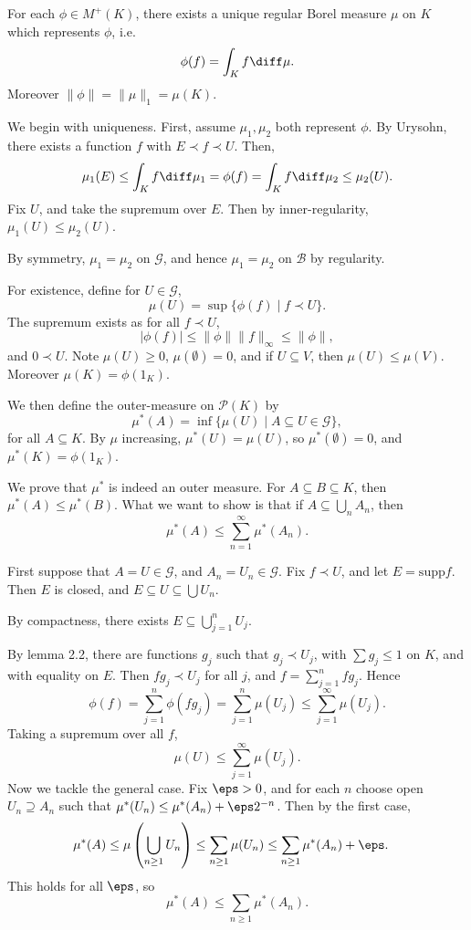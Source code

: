 \documentclass[12pt]{article}
\begin{document}
\begin{theorem}
	For each $\phi \in M^{+}(K)$, there exists a unique regular Borel measure $\mu$ on $K$ which represents $\phi$, i.e.
	\[
	\phi(f) = \int_K f \diff \mu.
	\]
	Moreover $\|\phi\| = \|\mu\|_1 = \mu(K)$.
\end{theorem}

\begin{proofbox}
	We begin with uniqueness. First, assume $\mu_1, \mu_2$ both represent $\phi$. By Urysohn, there exists a function $f$ with $E \prec f \prec U$. Then,
	\[
	\mu_1(E) \leq \int_K f \diff \mu_1 = \phi(f) = \int_K f \diff \mu_2 \leq \mu_2(U).
	\]
	Fix $U$, and take the supremum over $E$. Then by inner-regularity, $\mu_1(U) \leq \mu_2(U)$.

	By symmetry,  $\mu_1 = \mu_2$ on $\mathcal{G}$, and hence $\mu_1 = \mu_2$ on $\mathcal{B}$ by regularity.

	For existence, define for $U \in \mathcal{G}$,
	\[
		\mu(U) = \sup \{ \phi(f) \mid f \prec U\}.
	\]
	The supremum exists as for all $f \prec U$,
	\[
	|\phi(f)| \leq \|\phi\| \|f\|_\infty \leq \|\phi\|,
	\]
	and $0 \prec U$. Note $\mu(U) \geq 0$, $\mu(\emptyset) = 0$, and if $U \subseteq V$, then $\mu(U) \leq \mu(V)$. Moreover $\mu(K) = \phi(1_{K})$.

	We then define the outer-measure on $\mathcal{P}(K)$ by
	\[
		\mu^{\ast}(A) = \inf \{ \mu(U) \mid A \subseteq U \in \mathcal{G}\},
	\]
	for all $A \subseteq K$. By $\mu$ increasing, $\mu^{\ast}(U) = \mu(U)$, so $\mu^{\ast}(\emptyset) = 0$, and $\mu^{\ast}(K) = \phi(1_{K})$.

	We prove that $\mu^{\ast}$ is indeed an outer measure. For $A \subseteq B \subseteq K$, then $\mu^{\ast}(A) \leq \mu^{\ast}(B)$. What we want to show is that if $A \subseteq \bigcup_{n} A_n$, then
	\[
	\mu^{\ast} (A) \leq \sum_{n = 1}^\infty \mu^{\ast}(A_n).
	\]

	First suppose that $A = U \in \mathcal{G}$, and $A_n = U_n \in \mathcal{G}$. Fix $f \prec U$, and let $E = \mathrm{supp} f$. Then $E$ is closed, and $E \subseteq U \subseteq \bigcup U_n$.

	By compactness, there exists $E \subseteq \bigcup_{j=1}^n U_j$.

	By lemma 2.2, there are functions $g_j$ such that $g_j \prec U_j$, with $\sum g_j \leq 1$ on $K$, and with equality on $E$. Then $fg_j \prec U_j$ for all $j$, and $f = \sum_{j = 1}^n f g_j$. Hence
	\[
	\phi(f) = \sum_{j = 1}^n \phi(f g_j) = \sum_{j = 1}^n \mu(U_j) \leq \sum_{j = 1}^\infty \mu(U_j).
	\]
	Taking a supremum over all $f$,
	\[
	\mu(U) \leq \sum_{j = 1}^\infty \mu(U_j).
	\]
	Now we tackle the general case. Fix $\eps > 0$, and for each $n$ choose open $U_n \supseteq A_n$ such that $\mu^{\ast}(U_n) \leq \mu^{\ast}(A_n) + \eps 2^{-n}$. Then by the first case,
	\begin{align*}
		\mu^{\ast}(A) &\leq \mu \left( \bigcup_{n \geq 1} U_n \right) \leq \sum_{n \geq 1} \mu(U_n) \leq \sum_{n \geq 1} \mu^{\ast}(A_n) + \eps.
	\end{align*}
	This holds for all $\eps$, so
	\[
	\mu^{\ast}(A) \leq \sum_{n \geq 1} \mu^{\ast}(A_n).
	\]


\end{proofbox}
\end{document}
